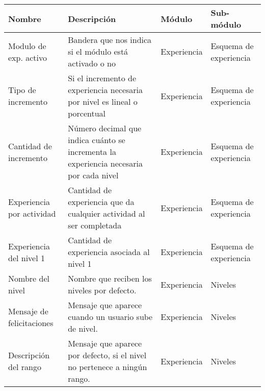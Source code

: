     \begin{center}
    \begin{tabular}{| m{} | m{} | m{} | m{}|}\hline
        {\bf Nombre} & {\bf Descripción} & {\bf Módulo} & {\bf Sub-módulo}  \\\hline
        
        Modulo de exp. activo &
            Bandera que nos indica si el módulo está activado o no &
            Experiencia & Esquema de \newline experiencia\\\hline 
         
        Tipo de incremento &
            Si el incremento de experiencia necesaria por nivel es lineal o porcentual &
            Experiencia & Esquema de \newline experiencia \\\hline 
         
        Cantidad de incremento &
            Número decimal que indica cuánto se incrementa la experiencia necesaria por cada nivel &
            Experiencia & Esquema de \newline experiencia \\\hline
        
        Experiencia por actividad &
            Cantidad de experiencia que da cualquier actividad al ser completada &
            Experiencia & Esquema de \newline experiencia \\\hline 
        
        Experiencia del nivel 1 &
            Cantidad de experiencia asociada al nivel 1 &
            Experiencia & Esquema de \newline experiencia \\\hline 
        
        Nombre del nivel &
            Nombre que reciben los niveles por defecto. &
            Experiencia & Niveles \\\hline 
        
        Mensaje de felicitaciones &
            Mensaje que aparece cuando un usuario sube de nivel. &
            Experiencia & Niveles \\\hline 
        
        Descripción del rango &
            Mensaje que aparece por defecto, si el nivel no pertenece a ningún rango. &
            Experiencia & Niveles \\\hline 
            

\end{tabular}
\end{center}
